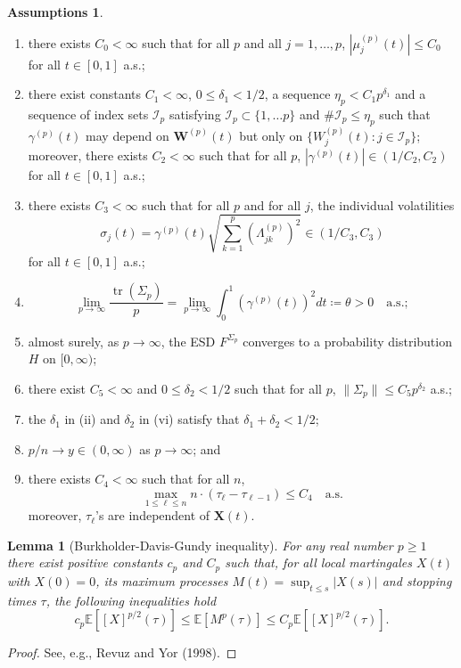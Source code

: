 \documentclass[a4paper,11pt]{book}
\theoremstyle{plain}
\newtheorem{lmm}[thm]{Lemma}
\theoremstyle{definition}
\newtheorem{asmp}[thm]{Assumptions}
\newcommand{\ME}{\mathbb{E}}
\newcommand{\tr}{\operatorname{tr}}
\begin{document}
    \begin{asmp} \label{asmp2} \
    	\begin{enumerate}
    		\item there exists $C_0 < \infty$ such that for all $p$ and all $j = 1, \dots, p$, $|\mu_j^{(p)}(t)| \leq C_0$ for all $t \in [0, 1]$ a.s.;
    		\item there exist constants $C_1 < \infty$, $0 \leq \delta_1 < 1/2$, a sequence $\eta_p < C_1 p^{\delta_1}$ and a sequence of index sets $\mathcal{I}_p$ satisfying $\mathcal{I}_p \subset \{ 1, \dots p \}$ and $\# \mathcal{I}_p \leq \eta_p$ such that $\gamma^{(p)}(t)$ may depend on $\mathbf{W}^{(p)}(t)$ but only on $\{ W_j^{(p)}(t) : j \in \mathcal{I}_p \}$; moreover, there exists $C_2 < \infty$ such that for all $p$, $|\gamma^{(p)}(t)| \in (1/C_2, C_2)$ for all $t \in [0, 1]$ a.s.;
    		\item there exists $C_3 < \infty$ such that for all $p$ and for all $j$, the individual volatilities \[ \sigma_j(t) = \gamma^{(p)}(t)\sqrt{\sum_{k=1}^{p} (\Lambda_{jk}^{(p)})^2} \in (1/C_3, C_3)\] for all $t \in [0, 1]$ a.s.;
    		\item \[ \lim_{p \rightarrow \infty} \frac{\tr(\Sigma_p)}{p} = \lim_{p \rightarrow \infty} \int_{0}^{1} (\gamma^{(p)}(t))^2 dt \coloneqq \theta > 0 \quad \text{a.s.}; \]
    		\item almost surely, as $p \rightarrow \infty$, the ESD $F^{\Sigma_p}$ converges to a probability distribution $H$ on $[0, \infty)$;
    		\item there exist $C_5 < \infty$ and $0 \leq \delta_2 < 1/2$ such that for all $p$, $\| \Sigma_p \| \leq C_5 p^{\delta_2}$ a.s.;
    		\item the $\delta_1$ in (ii) and $\delta_2$ in (vi) satisfy that $\delta_1 + \delta_2 < 1/2$;
    		\item $p/n \rightarrow y \in (0, \infty) $ as $p \rightarrow \infty$; and
    		\item there exists $C_4 < \infty$ such that for all $n$,
    		\[ \max_{1 \leq \ell \leq n} n \cdot (\tau_{\ell} - \tau_{\ell - 1}) \leq C_4 \quad \text{a.s.}  \]
    		moreover, $\tau_{\ell}$'s are independent of $\mathbf{X}(t)$.
    	\end{enumerate}
    \end{asmp}
    
    \begin{lmm}[Burkholder-Davis-Gundy inequality] \label{BDG}
    	For any real number $p \geq 1$ there exist positive constants $c_p$ and $C_p$ such that, for all local martingales $X(t)$ with $X(0) = 0$, its maximum processes $M(t) = \sup_{t \leq s} |X(s)|$ and stopping times $\tau$, the following inequalities hold
    	\[ c_p \ME[[X]^{p/2}(\tau)] \leq \ME[M^p(\tau)] \leq C_p \ME[[X]^{p/2}(\tau)]. \]
    \end{lmm}
    \begin{proof}
    	See, e.g., Revuz and Yor (1998).
    \end{proof}
    
\end{document}
